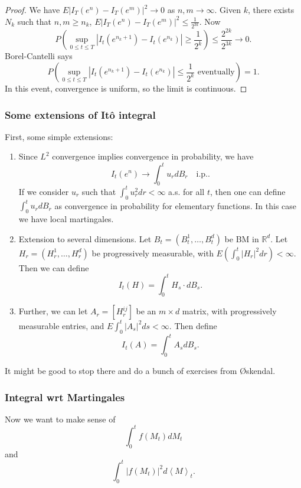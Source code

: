 \begin{proof}
	We have $E \left| I_T(e^n) - I_T(e^m) \right| ^2 \to 0$ as $n , m \to  \infty $. Given $k$, there exists $N_k$ such that $n, m \ge n_k$, $E \left| I_T(e^n) - I_T(e^m) \right| ^2 \le  \frac{1}{2^{3k}}$. Now
\[
		P\left( \sup _{0 \le t\le T} \left| I_t(e^{n_k + 1}) - I_t(e^{n_k}) \right| \ge \frac{1}{2^k} \right) 
		\le \frac{2^{2k}}{2^{3k}} \to  0 
	.\]
	Borel-Cantelli says 
	\[
		P\left( \sup _{0 \le t\le T} \left| I_t(e^{n_k + 1}) - I_t(e^{n_k}) \right| \le \frac{1}{2^k} \text{ eventually}\right)  = 1
	.\] 
	In this event, convergence is uniform, so the limit is continuous.
\end{proof}

\subsubsection{Some extensions of Itô integral}

First, some simple extensions:
\begin{enumerate}
	\item Since $L^2 $ convergence implies convergence in probability, we have
		\[
			I_t(e^n) \to  \int _0^t u_r d B_r \quad \text{i.p.}
		.\] 
		If we consider $u_r$ such that $\int _0^t u_r^2 dr < \infty $ a.s. for all $t$, then one can define $\int _0^t u_r d B_r$ as convergence in probability for elementary functions. In this case we have local martingales.
	\item Extension to several dimensions. Let $B_t = \left( B_t^1, \ldots, B_t^d \right) $ be BM in $\mathbb{R}^d$. Let $H_r = \left( H_r^1, \ldots, H_r^d \right) $ be progressively measurable, with $E\left( \int _0^t \left| H_r \right| ^2 dr  \right) < \infty $. Then we can define
		\[
			I_t(H) = \int _0^t H_s \cdot d B_s
		.\] 
	\item Further, we can let $A_r = \left[ H_r^{ij } \right] $ be an $m \times d$ matrix, with progressively measurable entries, and $E \int _0^t \left| A_s \right| ^2 ds < \infty $. Then define
		\[
			I_t(A) = \int _0^t A_s d B_s
		.\] 
\end{enumerate}

\followup It might be good to stop there and do a bunch of exercises from Øskendal.

\subsubsection{Integral wrt Martingales}



Now we want to make sense of
\[
	\int _0^t f(M_t) d M_t
\] 
and
\[
	\int _0^t \left| f(M_t) \right|^2 d \left\langle M \right\rangle _t 
.\] 

